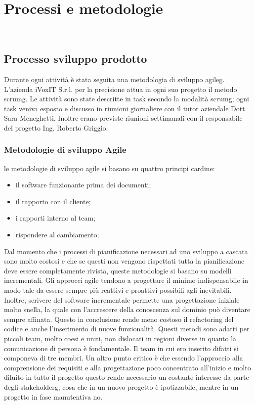 
\chapter{Processi e metodologie}
\label{cap:processi-metodologie}

\\

\section{Processo sviluppo prodotto}
Durante ogni attività è stata seguita una metodologia di sviluppo \gls{agileg}. L'azienda iVoxIT S.r.l. per la precisione attua in ogni suo progetto il metodo \gls{scrumg}. Le attività sono state descritte in task secondo la modalità \gls{scrumg}; ogni task veniva esposto e discusso in riunioni giornaliere con il tutor aziendale Dott. Sara Meneghetti. Inoltre erano previste riunioni settimanali con il responsabile del progetto Ing. Roberto Griggio.

\subsection{Metodologie di sviluppo Agile}
le metodologie di sviluppo agile si basano su quattro principi cardine:
\begin{itemize}
    \item il software funzionante prima dei documenti;
    \item il rapporto con il cliente;
    \item i rapporti interno al team;
    \item rispondere al cambiamento;
\end{itemize}

Dal momento che i processi di pianificazione necessari ad uno sviluppo a cascata sono molto costosi e che se questi non vengono rispettati tutta la pianificazione deve essere completamente rivista, queste metodologie si basano su modelli incrementali. Gli approcci agile tendono a progettare il minimo indispensabile in modo tale da essere sempre più reattivi e proattivi possibili agli inevitabili. Inoltre, scrivere del software incrementale permette una progettazione iniziale molto snella, la quale con l’accrescere della conoscenza sul dominio può diventare sempre affinata. Questo in conclusione rende meno costoso il refactoring del codice e anche l’inserimento di nuove funzionalità. 
Questi metodi sono adatti per piccoli team, molto coesi e uniti, non dislocati in regioni diverse in quanto la comunicazione di persona è fondamentale. Il team in cui ero inserito difatti si componeva di tre membri.
Un altro punto critico è che essendo l’approccio alla comprensione dei requisiti e alla progettazione poco concentrato all’inizio e molto diluito in tutto il progetto questo rende necessario un costante interesse da parte degli \gls{stakeholderg}, cosa che in un nuovo progetto è ipotizzabile, mentre in un progetto in fase manutentiva no.
